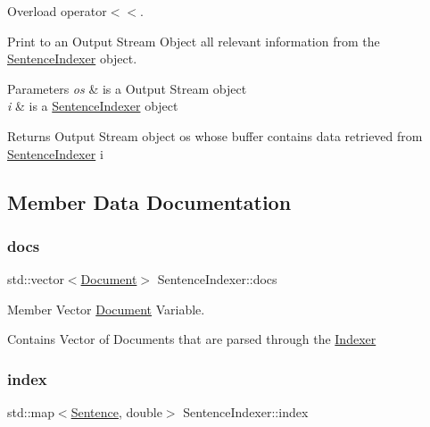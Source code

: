 Overload operator$<$$<$. 

Print to an Output Stream Object all relevant information from the \hyperlink{class_sentence_indexer}{Sentence\+Indexer} object.


\begin{DoxyParams}{Parameters}
{\em os} & is a Output Stream object \\
\hline
{\em i} & is a \hyperlink{class_sentence_indexer}{Sentence\+Indexer} object \\
\hline
\end{DoxyParams}
\begin{DoxyReturn}{Returns}
Output Stream object os whose buffer contains data retrieved from \hyperlink{class_sentence_indexer}{Sentence\+Indexer} i 
\end{DoxyReturn}


\subsection{Member Data Documentation}
\mbox{\label{class_sentence_indexer_aeb90cac752804711f0bb6a1eacf810f6}} 
\subsubsection{\texorpdfstring{docs}{docs}}
{\footnotesize\ttfamily std\+::vector$<$\hyperlink{class_document}{Document}$>$ Sentence\+Indexer\+::docs\hspace{0.3cm}{\ttfamily [private]}}



Member Vector \hyperlink{class_document}{Document} Variable. 

Contains Vector of Documents that are parsed through the \hyperlink{class_indexer}{Indexer} \mbox{\label{class_sentence_indexer_aabc21ba6e88b50f969a26d1eec8d4d7b}} 
\subsubsection{\texorpdfstring{index}{index}}
{\footnotesize\ttfamily std\+::map$<$\hyperlink{class_sentence}{Sentence}, double$>$ Sentence\+Indexer\+::index\hspace{0.3cm}{\ttfamily [private]}}



